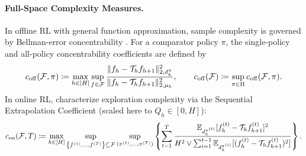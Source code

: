 \paragraph{Full-Space Complexity Measures.}
In offline RL with general function approximation, sample complexity is governed by Bellman-error concentrability \citep{xie2021bellman, zhan2022offline}. For a comparator policy $\pi$, the single-policy and all-policy concentrability coefficients are defined by
\begin{equation}
    c_{{\operatorname{off}}}({\mathcal{F}}, \pi) \coloneqq \max_{h \in [H]} \sup_{f \in {\mathcal{F}}} \frac{\|f_h - {\mathcal{T}}_h f_{h+1}\|_{2, d_h^\pi}^2}{\|f_h - {\mathcal{T}}_h f_{h+1}\|_{2, \mu_{h}}^2}, \qquad
    c_{{\operatorname{off}}}({\mathcal{F}}) \coloneqq \sup_{\pi \in \Pi} c_{{\operatorname{off}}}({\mathcal{F}}, \pi).
    \label{equ:ch02-off_c}
\end{equation}
In online RL, \citet{xie2022role} characterize exploration complexity via the Sequential Extrapolation Coefficient (scaled here to $Q_h \in [0, H]$):
\begin{equation}
    c_{{\operatorname{on}}}({\mathcal{F}},T) \coloneqq \max_{h \in [H]} \sup_{\left\{f^{(1)}, \ldots, f^{(T)}\right\} \subseteq {\mathcal{F}}} \sup_{(\pi^{(1)}, \dots, \pi^{(T)})} \left\{\sum_{t=1}^T \frac{\mathbb{E}_{d_h^{\pi^{(t)}}}[f_h^{(t)} - {\mathcal{T}}_h f_{h+1}^{(t)}]^2}{H^2 \vee \sum_{i=1}^{t-1} \mathbb{E}_{d_h^{\pi^{(i)}}}[(f_h^{(t)} - {\mathcal{T}}_h f_{h+1}^{(t)})^2]}\right\}.
    \label{equ:ch02-on_c}
\end{equation}

